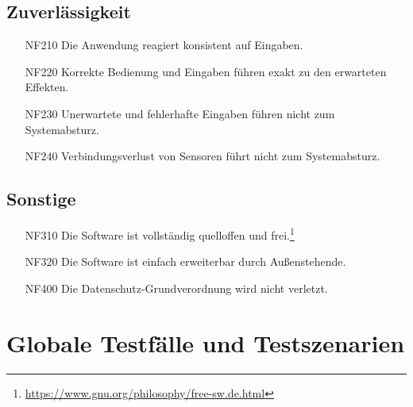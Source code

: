 \documentclass[parskip=full]{scrartcl}
\begin{document}
\subsection{Zuverlässigkeit}

\begin{itemize}

\item[NF210] Die Anwendung reagiert konsistent auf Eingaben.
\item[NF220] Korrekte Bedienung und Eingaben führen exakt zu den erwarteten Effekten.
\item[NF230] Unerwartete und fehlerhafte Eingaben führen nicht zum Systemabsturz.
\item[NF240] Verbindungsverlust von Sensoren führt nicht zum Systemabsturz.

\end{itemize}

\subsection{Sonstige}

\begin{itemize}

\item[NF310] Die Software ist vollständig quelloffen und frei.\footnote{\url{https://www.gnu.org/philosophy/free-sw.de.html}}
\item[NF320] Die Software ist einfach erweiterbar durch Außenstehende.
\item[NF400] Die Datenschutz-Grundverordnung wird nicht verletzt.

\end{itemize}

\section{Globale Testfälle und Testszenarien}
\end{document}
